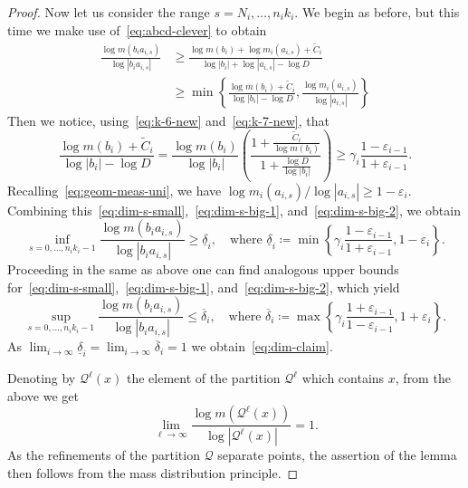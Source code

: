 \documentclass[english, 10pt]{amsart}
\numberwithin{equation}{section}
\theoremstyle{definition}
\theoremstyle{plain}
\theoremstyle{plain}
\theoremstyle{definition}
\theoremstyle{definition}
\theoremstyle{plain}
\theoremstyle{definition}
\newcommand{\eps}{\varepsilon}
\newcommand{\cQ}{{\mathcal Q}}
\newcommand{\eqdef}{\coloneqq}
\numberwithin{equation}{section}
\begin{document}
\begin{proof}
  Now let us consider the range $s = N_i, \ldots ,n_{i}k_i$. We begin as before, but this time we make use of~\eqref{eq:abcd-clever} to obtain
  \begin{align}
    \nonumber
    \frac{
      \log m ( b_i a_{i,s})
    }
    {
      \log |b_i a_{i,s}|
    }
    &\ge 
    \frac{ \log m ( b_i ) + \log m_i (a_{i,s}) + \widetilde C_i }
    { \log |b_{i}|  + \log |a_{i,s}| - \log D } \\
    \label{eq:dim-s-big-1}
    &\ge
    \min\left\{
    \frac{ \log m ( b_i ) + \widetilde C_i }
    { \log |b_{i}|  - \log D },
    \frac{ \log m_i (a_{i,s}) }
    {  \log |a_{i,s}| } 
    \right\}
  \end{align}
  Then we notice, using~\eqref{eq:k-6-new} and~\eqref{eq:k-7-new}, that
  \begin{equation}
    \label{eq:dim-s-big-2}
    \frac{ \log m ( b_i ) + \widetilde C_i }
    { \log |b_{i}|  - \log D }
    =
    \frac{ \log m ( b_i )}
    { \log |b_{i}|  }
    \left(
    \frac{ 1 + \frac{\widetilde C_i}{\log m ( b_i )} }
    { 1 + \frac{\log D }{\log |b_{i}|}}
    \right)
    \ge \gamma_i \frac{ 1 - \eps_{ i - 1 } }{ 1 + \eps_{ i - 1 } }.
  \end{equation}
  Recalling~\eqref{eq:geom-meas-uni}, we have $\log m_i (a_{i,s}) / \log |a_{i,s}| \ge 1 - \eps_i$. Combining this~\eqref{eq:dim-s-small},~\eqref{eq:dim-s-big-1}, and~\eqref{eq:dim-s-big-2}, we obtain
  \[
    \inf_{s = 0 ,\ldots, n_i k_i - 1} \frac{ \log m ( b_i a_{i,s} ) }{ \log |b_i a_{i,s}|} \ge \underline{\delta}_i,
    \quad
    \text{where }
    \underline{\delta}_i \eqdef
    \min\left\{
    \gamma_i \frac{ 1 - \eps_{ i - 1 }} {1  + \eps_{i - 1 }},
    1  - \eps_i
    \right\}.
  \]
  Proceeding in the same as above one can find analogous upper bounds for~\eqref{eq:dim-s-small},~\eqref{eq:dim-s-big-1}, and~\eqref{eq:dim-s-big-2}, which yield
  \[
    \sup_{s = 0 ,\ldots, n_i k_i - 1} \frac{ \log m ( b_i a_{i,s} ) }{ \log |b_i a_{i,s}|} \le \overline{\delta}_i,
    \quad
    \text{where }
    \overline{\delta}_i \eqdef
    \max\left\{
    \gamma_i \frac{ 1 + \eps_{ i - 1 }} {1  -  \eps_{i - 1 }},
    1  + \eps_i
    \right\}.
  \]
  As $\lim_{i \to \infty} \underline{\delta}_i = \lim_{ i \to \infty } \overline{\delta}_i = 1$ we obtain~\eqref{eq:dim-claim}.

  Denoting by $\cQ^\ell(x)$ the element of the partition $\cQ^\ell$ which contains $x$, from the above we get
  \[
    \lim_{\ell \to \infty}\frac{ \log m ( \cQ^{\ell}(x) ) }{ \log|\cQ^{\ell}(x)|} = 1.
  \]
  As the refinements of the partition $\cQ$ separate points, the assertion of the lemma then follows from the mass distribution principle.
\end{proof}
\end{document}
